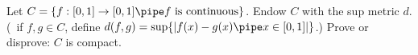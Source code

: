 Let $C=\{f:[0,1]\rightarrow [0,1]\pipe f \text{\ is
continuous}\}$. Endow $C$ with the sup metric $d$. (\Ie\ if $f,g\in
C$, define $d(f,g)=\sup\{|f(x)-g(x)\pipe x\in [0,1]|\}$.) Prove or
disprove: $C$ is compact.
